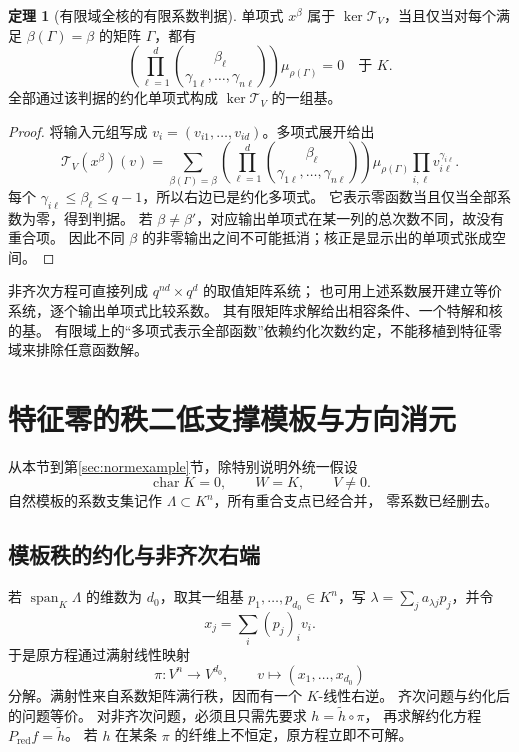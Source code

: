 \documentclass[UTF8,11pt,a4paper]{ctexart}
\theoremstyle{definition}
\newtheorem{theorem}{定理}[section]
\newcommand{\Span}{\operatorname{span}}
\newcommand{\T}{\mathcal T}
\numberwithin{equation}{section}
\begin{document}
\begin{theorem}[有限域全核的有限系数判据]\label{thm:finitefull}
单项式 $x^\beta$ 属于 $\ker\T_V$，当且仅当对每个满足
$\beta(\Gamma)=\beta$ 的矩阵 $\Gamma$，都有
\begin{equation}\label{eq:finitecoef}
 \left(\prod_{\ell=1}^d
 \binom{\beta_\ell}{\gamma_{1\ell},\ldots,\gamma_{n\ell}}\right)
 \mu_{\rho(\Gamma)}=0\quad\text{于 }K.
\end{equation}
全部通过该判据的约化单项式构成 $\ker\T_V$ 的一组基。
\end{theorem}
\begin{proof}
将输入元组写成 $v_i=(v_{i1},\ldots,v_{id})$。多项式展开给出
\[
 \T_V(x^\beta)(v)
 =
 \sum_{\beta(\Gamma)=\beta}
 \left(\prod_{\ell=1}^d
 \binom{\beta_\ell}{\gamma_{1\ell},\ldots,\gamma_{n\ell}}\right)
 \mu_{\rho(\Gamma)}
 \prod_{i,\ell}v_{i\ell}^{\gamma_{i\ell}}.
\]
每个 $\gamma_{i\ell}\le\beta_\ell\le q-1$，所以右边已是约化多项式。
它表示零函数当且仅当全部系数为零，得到判据。
若 $\beta\ne\beta'$，对应输出单项式在某一列的总次数不同，故没有重合项。
因此不同 $\beta$ 的非零输出之间不可能抵消；核正是显示出的单项式张成空间。
\end{proof}

非齐次方程可直接列成 $q^{nd}\times q^d$ 的取值矩阵系统；
也可用上述系数展开建立等价系统，逐个输出单项式比较系数。
其有限矩阵求解给出相容条件、一个特解和核的基。
有限域上的“多项式表示全部函数”依赖约化次数约定，不能移植到特征零域来排除任意函数解。

\section{特征零的秩二低支撑模板与方向消元}\label{sec:lowrank}
从本节到第\ref{sec:normexample}节，除特别说明外统一假设
\[
 \operatorname{char}K=0,\qquad W=K,\qquad V\ne0.
\]
自然模板的系数支集记作 $\Lambda\subset K^n$，所有重合支点已经合并，
零系数已经删去。

\subsection{模板秩的约化与非齐次右端}
若 $\Span_K\Lambda$ 的维数为 $d_0$，取其一组基
$p_1,\ldots,p_{d_0}\in K^n$，写
$\lambda=\sum_j a_{\lambda j}p_j$，并令
\[
 x_j=\sum_i(p_j)_i v_i.
\]
于是原方程通过满射线性映射
\[
 \pi:V^n\longrightarrow V^{d_0},\qquad v\longmapsto(x_1,\ldots,x_{d_0})
\]
分解。满射性来自系数矩阵满行秩，因而有一个 $K$-线性右逆。
齐次问题与约化后的问题等价。
对非齐次问题，必须且只需先要求 $h=\widetilde h\circ\pi$，
再求解约化方程 $P_{\mathrm{red}}f=\widetilde h$。
若 $h$ 在某条 $\pi$ 的纤维上不恒定，原方程立即不可解。
\end{document}
